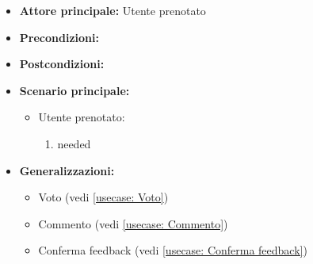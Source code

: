 \label{usecase:Inserimento di feedback}
\begin{itemize}
\item \textbf{Attore principale:}  Utente prenotato
\item \textbf{Precondizioni:}
\item \textbf{Postcondizioni:}
\item \textbf{Scenario principale:}
\begin{itemize}
\item  Utente prenotato:
\begin{enumerate}
\item needed
\end{enumerate}
\end{itemize}
\item \textbf{Generalizzazioni:}
\begin{itemize}
\item  Voto (vedi \autoref{usecase: Voto})
\item  Commento (vedi \autoref{usecase: Commento})
\item  Conferma feedback (vedi \autoref{usecase: Conferma feedback})
\end{itemize}
\end{itemize}